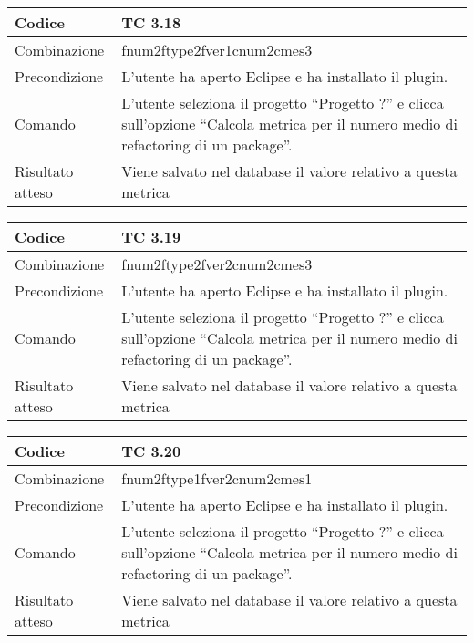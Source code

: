 \begin{table}[ht]
\begin{tabular}{|p{3cm}|p{9cm}|}
\hline
\cellcolor{lightgray}Codice				& TC 3.18								\\
\hline
\cellcolor{lightgray}Combinazione		& fnum2ftype2fver1cnum2cmes3  									\\
\hline
\cellcolor{lightgray}Precondizione		& L'utente ha aperto Eclipse e ha installato il plugin.				\\
\hline
\cellcolor{lightgray}Comando			& L'utente seleziona il progetto ``Progetto ?''  e clicca sull'opzione ``Calcola metrica per il numero medio di refactoring di un package''.	\\
\hline
\cellcolor{lightgray}Risultato atteso	& Viene salvato nel database il valore relativo a questa metrica	\\
\hline
\end{tabular}
\end{table}

\begin{table}[ht]
\begin{tabular}{|p{3cm}|p{9cm}|}
\hline
\cellcolor{lightgray}Codice				& TC 3.19								\\
\hline
\cellcolor{lightgray}Combinazione		& fnum2ftype2fver2cnum2cmes3 									\\
\hline
\cellcolor{lightgray}Precondizione		& L'utente ha aperto Eclipse e ha installato il plugin.								\\
\hline
\cellcolor{lightgray}Comando			& L'utente seleziona il progetto ``Progetto ?''  e clicca sull'opzione ``Calcola metrica per il numero medio di refactoring di un package''.	\\
\hline
\cellcolor{lightgray}Risultato atteso	& Viene salvato nel database il valore relativo a questa metrica	\\
\hline
\end{tabular}
\end{table}

\begin{table}[ht]
\begin{tabular}{|p{3cm}|p{9cm}|}
\hline
\cellcolor{lightgray}Codice				& TC 3.20								\\
\hline
\cellcolor{lightgray}Combinazione		& fnum2ftype1fver2cnum2cmes1 									\\
\hline
\cellcolor{lightgray}Precondizione		& L'utente ha aperto Eclipse e ha installato il plugin.									\\
\hline
\cellcolor{lightgray}Comando			& L'utente seleziona il progetto ``Progetto ?''  e clicca sull'opzione ``Calcola metrica per il numero medio di refactoring di un package''.	\\
\hline
\cellcolor{lightgray}Risultato atteso	& Viene salvato nel database il valore relativo a questa metrica	\\
\hline
\end{tabular}
\end{table}

